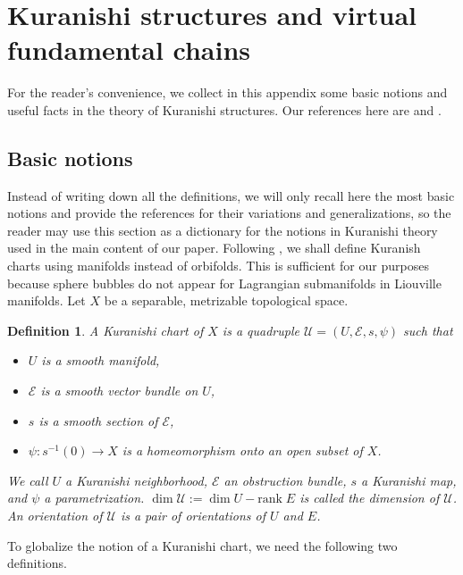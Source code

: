 \documentclass[a4paper]{article}
\newtheorem{definition}[theorem]{Definition}
\numberwithin{equation}{section}
\begin{document}
\appendix

\section{Kuranishi structures and virtual fundamental chains}\label{section:Kuranishi}

For the reader's convenience, we collect in this appendix some basic notions and useful facts in the theory of Kuranishi structures. Our references here are \cite{fooo1,fooo2,fooo3,fooo4} and \cite{ki2}.

\subsection{Basic notions}\label{section:basic}

Instead of writing down all the definitions, we will only recall here the most basic notions and provide the references for their variations and generalizations, so the reader may use this section as a dictionary for the notions in Kuranishi theory used in the main content of our paper. Following \cite{ki2}, we shall define Kuranish charts using manifolds instead of orbifolds. This is sufficient for our purposes because sphere bubbles do not appear for Lagrangian submanifolds in Liouville manifolds. Let $X$ be a separable, metrizable topological space.

\begin{definition}
A Kuranishi chart of $X$ is a quadruple $\mathcal{U}=(U,\mathcal{E},s,\psi)$ such that
    \begin{itemize}
		\item[(i)] $U$ is a smooth manifold,
		\item[(ii)] $\mathcal{E}$ is a smooth vector bundle on $U$,
		\item[(iii)] $s$ is a smooth section of $\mathcal{E}$,
		\item[(iv)] $\psi:s^{-1}(0)\rightarrow X$ is a homeomorphism onto an open subset of $X$.
	\end{itemize}
We call $U$ a Kuranishi neighborhood, $\mathcal{E}$ an obstruction bundle, $s$ a Kuranishi map, and $\psi$ a parametrization. $\dim\mathcal{U}:=\dim U-\mathrm{rank}\;E$ is called the dimension of $\mathcal{U}$. An orientation of $\mathcal{U}$ is a pair of orientations of $U$ and $E$.
\end{definition}

To globalize the notion of a Kuranishi chart, we need the following two definitions.
\end{document}
